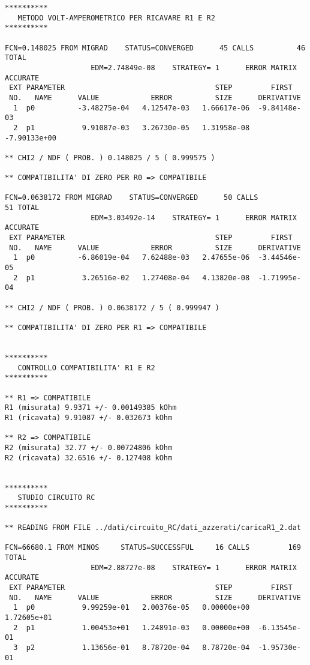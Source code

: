 {\fontsize{6}{6}
\begin{verbatim}
**********
   METODO VOLT-AMPEROMETRICO PER RICAVARE R1 E R2
**********

FCN=0.148025 FROM MIGRAD    STATUS=CONVERGED      45 CALLS          46 TOTAL
                    EDM=2.74849e-08    STRATEGY= 1      ERROR MATRIX ACCURATE 
 EXT PARAMETER                                   STEP         FIRST   
 NO.   NAME      VALUE            ERROR          SIZE      DERIVATIVE 
  1  p0          -3.48275e-04   4.12547e-03   1.66617e-06  -9.84148e-03
  2  p1           9.91087e-03   3.26730e-05   1.31958e-08  -7.90133e+00

** CHI2 / NDF ( PROB. ) 0.148025 / 5 ( 0.999575 )

** COMPATIBILITA' DI ZERO PER R0 => COMPATIBILE

FCN=0.0638172 FROM MIGRAD    STATUS=CONVERGED      50 CALLS          51 TOTAL
                    EDM=3.03492e-14    STRATEGY= 1      ERROR MATRIX ACCURATE 
 EXT PARAMETER                                   STEP         FIRST   
 NO.   NAME      VALUE            ERROR          SIZE      DERIVATIVE 
  1  p0          -6.86019e-04   7.62488e-03   2.47655e-06  -3.44546e-05
  2  p1           3.26516e-02   1.27408e-04   4.13820e-08  -1.71995e-04

** CHI2 / NDF ( PROB. ) 0.0638172 / 5 ( 0.999947 )

** COMPATIBILITA' DI ZERO PER R1 => COMPATIBILE


**********
   CONTROLLO COMPATIBILITA' R1 E R2
**********

** R1 => COMPATIBILE
R1 (misurata) 9.9371 +/- 0.00149385 kOhm
R1 (ricavata) 9.91087 +/- 0.032673 kOhm

** R2 => COMPATIBILE
R2 (misurata) 32.77 +/- 0.00724806 kOhm
R2 (ricavata) 32.6516 +/- 0.127408 kOhm


**********
   STUDIO CIRCUITO RC
**********

** READING FROM FILE ../dati/circuito_RC/dati_azzerati/caricaR1_2.dat

FCN=66680.1 FROM MINOS     STATUS=SUCCESSFUL     16 CALLS         169 TOTAL
                    EDM=2.88727e-08    STRATEGY= 1      ERROR MATRIX ACCURATE 
 EXT PARAMETER                                   STEP         FIRST   
 NO.   NAME      VALUE            ERROR          SIZE      DERIVATIVE 
  1  p0           9.99259e-01   2.00376e-05   0.00000e+00   1.72605e+01
  2  p1           1.00453e+01   1.24891e-03   0.00000e+00  -6.13545e-01
  3  p2           1.13656e-01   8.78720e-04   8.78720e-04  -1.95730e-01


\end{verbatim}}
